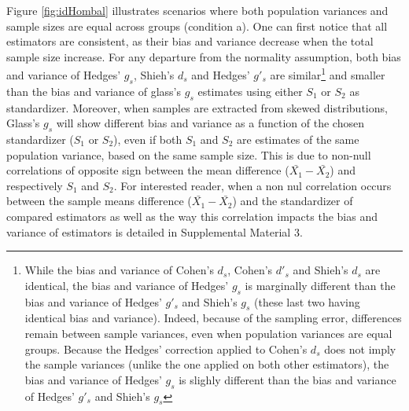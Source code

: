 \documentclass[
  man,floatsintext]{apa6}
\begin{document}
Figure \ref{fig:idHombal} illustrates scenarios where both population variances and sample sizes are equal across groups (condition a). One can first notice that all estimators are consistent, as their bias and variance decrease when the total sample size increase. For any departure from the normality assumption, both bias and variance of Hedges' \(g_s\), Shieh's \(d_s\) and Hedges' \(g'_s\) are similar\footnote{While the bias and variance of Cohen's $d_s$, Cohen's $d'_s$ and Shieh's $d_s$ are identical, the bias and variance of Hedges' $g_s$ is marginally different than the bias and variance of Hedges' $g'_s$ and Shieh's $g_s$ (these last two having identical bias and variance). Indeed, because of the sampling error, differences remain between sample variances, even when population variances are equal groups. Because the Hedges' correction applied to Cohen's $d_s$ does not imply the sample variances (unlike the one applied on both other estimators), the bias and variance of Hedges' $g_s$ is slighly different than the bias and variance of Hedges' $g'_s$ and Shieh's $g_s$} and smaller than the bias and variance of glass's \(g_s\) estimates using either \(S_1\) or \(S_2\) as standardizer. Moreover, when samples are extracted from skewed distributions, Glass's \(g_s\) will show different bias and variance as a function of the chosen standardizer (\(S_1\) or \(S_2\)), even if both \(S_1\) and \(S_2\) are estimates of the same population variance, based on the same sample size. This is due to non-null correlations of opposite sign between the mean difference (\(\bar{X_1}-\bar{X_2}\)) and respectively \(S_1\) and \(S_2\). For interested reader, when a non nul correlation occurs between the sample means difference (\(\bar{X_1}-\bar{X_2}\)) and the standardizer of compared estimators as well as the way this correlation impacts the bias and variance of estimators is detailed in Supplemental Material 3.
\end{document}

